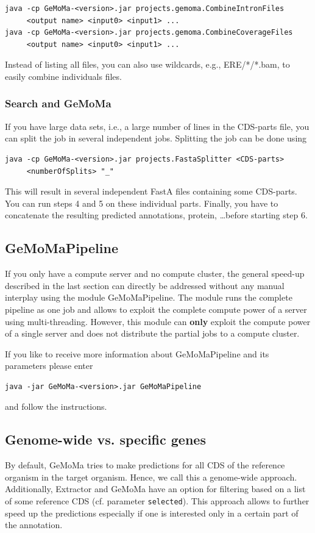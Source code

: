 \documentclass{article}
\begin{document}
\begin{verbatim}
java -cp GeMoMa-<version>.jar projects.gemoma.CombineIntronFiles
     <output name> <input0> <input1> ...
java -cp GeMoMa-<version>.jar projects.gemoma.CombineCoverageFiles
     <output name> <input0> <input1> ...
\end{verbatim}

Instead of listing all files, you can also use wildcards, e.g., ERE/*/*.bam, to easily combine individuals files.

\subsubsection{Search and GeMoMa}
If you have large data sets, i.e., a large number of lines in the CDS-parts file, you can split the job in several independent jobs. Splitting the job can be done using
\begin{verbatim}
java -cp GeMoMa-<version>.jar projects.FastaSplitter <CDS-parts> 
     <numberOfSplits> "_"
\end{verbatim}

This will result in several independent FastA files containing some CDS-parts. You can run steps 4 and 5 on these individual parts.
Finally, you have to concatenate the resulting predicted annotations, protein, \ldots before starting step 6.

\subsection{GeMoMaPipeline}
If you only have a compute server and no compute cluster, the general speed-up described in the last section can directly be addressed without any manual interplay using the module GeMoMaPipeline. The module runs the complete pipeline as one job and allows to exploit the complete compute power of a server using multi-threading. 
However, this module can \textbf{only} exploit the compute power of a single server and does not distribute the partial jobs to a compute cluster.

If you like to receive more information about GeMoMaPipeline and its parameters please enter
\begin{verbatim}
java -jar GeMoMa-<version>.jar GeMoMaPipeline
\end{verbatim}
and follow the instructions.

\subsection{Genome-wide vs. specific genes}
By default, GeMoMa tries to make predictions for all CDS of the reference organism in the target organism. Hence, we call this a genome-wide approach. Additionally, Extractor and GeMoMa have an option for filtering based on a list of some reference CDS (cf. parameter \texttt{selected}). This approach allows to further speed up the predictions especially if one is interested only in a certain part of the annotation.
\end{document}
